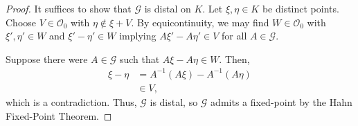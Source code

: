 \documentclass[10pt]{mypackage}
\begin{document}
\begin{proof}
  It suffices to show that $ \mathcal{G} $ is distal on $K$. Let $\xi,\eta\in K$ be distinct points. Choose $V\in \mathcal{O}_{0}$ with $\eta\notin \xi + V$. By equicontinuity, we may find $W\in \mathcal{O}_{0}$ with $\xi',\eta'\in W$ and $\xi'-\eta'\in W$ implying $A\xi' - A\eta'\in V$ for all $A\in \mathcal{G}$.

  Suppose there were $A\in \mathcal{G}$ such that $A\xi - A\eta\in W$. Then,
  \begin{align*}
    \xi - \eta &= A^{-1}\left( A\xi \right) - A^{-1}\left( A\eta \right)\\
               &\in V,
  \end{align*}
  which is a contradiction. Thus, $ \mathcal{G} $ is distal, so $\mathcal{G}$ admits a fixed-point by the Hahn Fixed-Point Theorem.
\end{proof}
\end{document}
